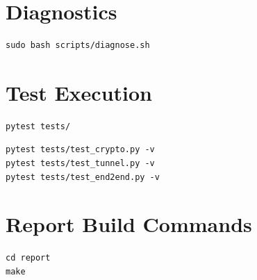 \section{Diagnostics}
\begin{lstlisting}[style=vpnbash,caption={Automated diagnostics script}]
sudo bash scripts/diagnose.sh
\end{lstlisting}

\section{Test Execution}
\begin{lstlisting}[style=vpnbash,caption={Run all tests}]
pytest tests/
\end{lstlisting}

\begin{lstlisting}[style=vpnbash,caption={Run focused test modules}]
pytest tests/test_crypto.py -v
pytest tests/test_tunnel.py -v
pytest tests/test_end2end.py -v
\end{lstlisting}

\section{Report Build Commands}
\begin{lstlisting}[style=vpnbash,caption={Build LaTeX report PDF}]
cd report
make
\end{lstlisting}
